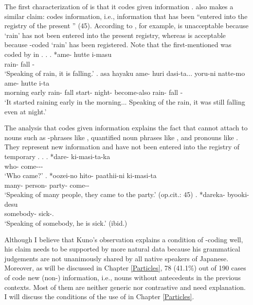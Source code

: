 The first characterization of  is that it codes given information
\cite[233]{chafe70}.
 also makes a similar claim:
 codes  information,
i.e.,
information that has been ``entered into the registry of the
present '' (45).
According to , for example,
\Next[a] is unacceptable because
 `rain' has not been entered into the present registry,
whereas \Next[b] is acceptable because
-coded  `rain' has been registered.
Note that the first-mentioned  was coded by  in \Next[b].
%
\ex.
 \ag. *ame- hutte i-masu \\
       rain- fall - \\
       `Speaking of rain, it is falling.'
 \bg. asa hayaku ame- huri dasi-ta... yoru-ni natte-mo ame- hutte i-ta \\
       morning early rain- fall start- night- become-also rain- fall -\\
       `It started raining early in the morning...
       Speaking of the rain, it was still falling even at night.'
       \hfill{\cite[45]{kuno73}}


The analysis that  codes given information
explains the fact that
 cannot attach to nouns such as -phrases like \Next[a],
quantified noun phrases like \Next[b],
and  pronouns like \Next[c].
They represent new information and have not been entered into the registry of temporary .
%
\ex.
 \ag. *dare- ki-masi-ta-ka \\
       who- come--- \\
       `Who came?'
       \hfill{\cite[37]{kuno73}}
 \bg. *oozei-no hito- paathii-ni ki-masi-ta \\
       many- person- party- come-- \\
       `Speaking of many people, they came to the party.'
       \hfill{(op.cit.: 45)}
 \bg. *dareka- byooki-desu \\
       somebody- sick-.\\
       `Speaking of somebody, he is sick.'
       \hfill{(ibid.)}


Although I believe that Kuno's observation explains
a condition of -coding well,
his claim needs to be supported by more natural data
because his grammatical judgements are not unanimously shared by all native speakers of Japanese.
Moreover,
as will be discussed in Chapter \ref{Particles},
78 (41.1\%) out of 190 cases of  code new (non-) information, i.e., nouns without antecedents in the previous contexts. 
Most of them are neither generic nor contrastive and need explanation.
I will discuss the conditions of the use of 
in Chapter \ref{Particles}.


